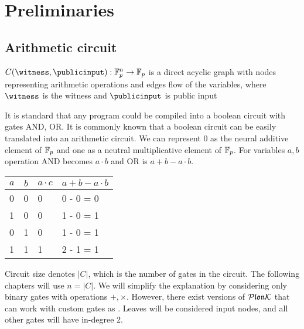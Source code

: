 \chapter{Preliminaries}
\label{prelim}

\section{Arithmetic circuit}
\label{arithmetic-circuit}
\begin{definition}
    $C(\witness, \publicinput): \field^n \rightarrow \field$ is a direct acyclic graph with nodes representing arithmetic operations and edges flow of the variables, where $\witness$ is the witness and $\publicinput$ is public input
\end{definition}

It is standard that any program could be compiled into a boolean circuit with gates AND, OR. It is commonly known that a boolean circuit can be easily translated into an arithmetic circuit. We can represent 0 as the neural additive element of $\mathbb{F}_p$ and one as a neutral multiplicative element of $\mathbb{F}_p$. For variables $a, b$ operation AND becomes $a \cdot b$ and OR is $a+b - a \cdot b$.

\begin{table}[H]
    \centering
    \begin{tabular}{|l|l|l|l|}
    \hline
    $a$ & \multicolumn{1}{c|}{$b$} & $a\cdot c$ & $a+b - a \cdot b$ \\ \hline
    0   & 0                        & 0           & 0 - 0 = 0                  \\ \hline
    1   & 0                        & 0           & 1 - 0 = 1               \\ \hline
    0   & 1                        & 0           & 1 - 0 = 1                \\ \hline
    1   & 1                        & 1           & 2 - 1 = 1               \\ \hline
    \end{tabular}
\end{table}

Circuit size denotes $|C|$, which is the number of gates in the circuit. The following chapters will use $n = |C|$. We will simplify the explanation by considering only binary gates with operations $+, \times$. However, there exist versions of $\mathcal{P}\mathfrak{lon}\mathcal{K}$ that can work with custom gates as \cite{HyperPlonk}. Leaves will be considered input nodes, and all other gates will have in-degree 2.


